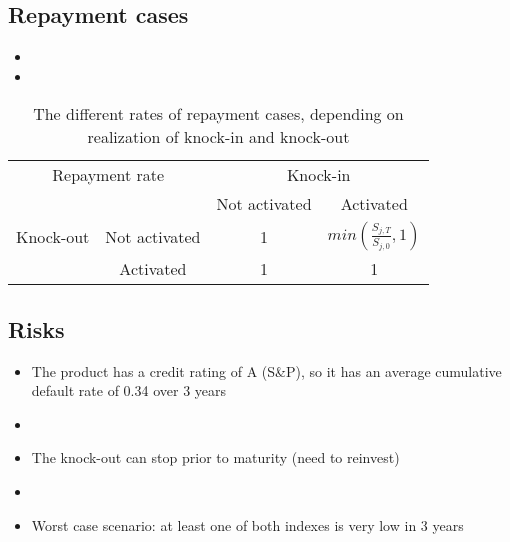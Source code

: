 \subsection{Repayment cases}
\begin{frame}
\myframetitle{}
\begin{itemize}
		\item []
		\item []
\end{itemize}
\begin{table}[c]
	\centering
	\begin{tabular}{|c|c|c|c|} 
    \hline
    \multicolumn{2}{|c|}{Repayment rate} & \multicolumn{2}{c|}{Knock-in} 										 \\
		\cline{3-4}
    \multicolumn{2}{|c|}{}  						 & Not activated 	& Activated 											 \\
    \hline
		Knock-out & Not activated 					 & 1 							& $min(\frac{S_{j,T}}{S_{j,0}},1)$ \\
		\cline{2-4}
							& Activated 							 & 1 							&	1 															 \\
    \hline
	\end{tabular}
	\caption{The different rates of repayment cases, depending on realization of knock-in and knock-out}
\end{table}

\end{frame}

\subsection{Risks}
\begin{frame}[c]
\myframetitle{}
\begin{itemize}
	\item The product has a credit rating of A (S\&P), so it has an average cumulative default rate of 0.34 over 3 years
	\item []
	\item The knock-out can stop prior to maturity (need to reinvest)
	\item []
	\item Worst case scenario: at least one of both indexes is very low in 3 years
\end{itemize}
\end{frame}

